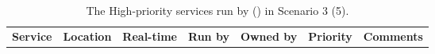 \begin{table} \centering
{}
\begin{tabular}{p{\mycolwidth} p{\mycolwidth} l l l l p{\mycolwidth}}
{\bf \tiny Service}  & {\bf \tiny Location} & \bf {\tiny Real-time} & {\bf \tiny Run by} & \bf {\tiny Owned by} & {\bf \tiny Priority} & {\bf \tiny Comments} \\

\end{tabular}
\caption{The High-priority \einfra services run by \EC (\nnt) in Scenario 3 (5).
\label{tab:services:s3}}
\end{table}
